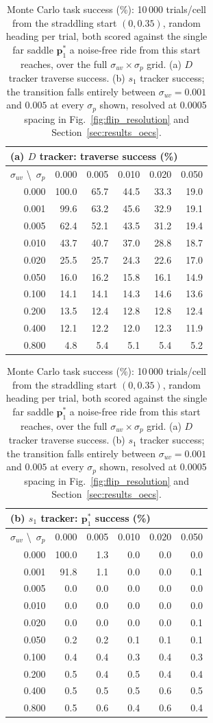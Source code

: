 \documentclass[lettersize,journal]{IEEEtran}
\begin{document}
\begin{table}[!t]
\centering
\caption{Monte Carlo task success (\%): 10\,000 trials/cell from the
straddling start $(0, 0.35)$, random heading per trial, both scored
against the single far saddle $\mathbf{p}^*_1$ a noise-free ride from
this start reaches, over the full $\sigma_{uv} \times \sigma_p$ grid.
(a) $D$ tracker traverse success. (b) $s_1$ tracker success; the
transition falls entirely between $\sigma_{uv} = 0.001$ and $0.005$ at
every $\sigma_p$ shown, resolved at 0.0005 spacing in
Fig.~\ref{fig:flip_resolution} and Section~\ref{sec:results_oecs}.}
\label{tab:mc_success}
\footnotesize
\setlength{\tabcolsep}{4pt}
\begin{tabular}{r|rrrrr}
\multicolumn{6}{l}{(a) $D$ tracker: traverse success (\%)} \\
\hline
$\sigma_{uv}$ \textbackslash\ $\sigma_p$ & 0.000 & 0.005 & 0.010 & 0.020 & 0.050 \\
\hline
0.000 & 100.0 & 65.7 & 44.5 & 33.3 & 19.0 \\
0.001 &  99.6 & 63.2 & 45.6 & 32.9 & 19.1 \\
0.005 &  62.4 & 52.1 & 43.5 & 31.2 & 19.4 \\
0.010 &  43.7 & 40.7 & 37.0 & 28.8 & 18.7 \\
0.020 &  25.5 & 25.7 & 24.3 & 22.6 & 17.0 \\
0.050 &  16.0 & 16.2 & 15.8 & 16.1 & 14.9 \\
0.100 &  14.1 & 14.1 & 14.3 & 14.6 & 13.6 \\
0.200 &  13.5 & 12.4 & 12.8 & 12.8 & 12.4 \\
0.400 &  12.1 & 12.2 & 12.0 & 12.3 & 11.9 \\
0.800 &   4.8 &  5.4 &  5.1 &  5.4 &  5.2 \\
\hline
\end{tabular}
\hspace{1.5em}
\begin{tabular}{r|rrrrr}
\multicolumn{6}{l}{(b) $s_1$ tracker: $\mathbf{p}^*_1$ success (\%)} \\
\hline
$\sigma_{uv}$ \textbackslash\ $\sigma_p$ & 0.000 & 0.005 & 0.010 & 0.020 & 0.050 \\
\hline
0.000 & 100.0 &  1.3 &  0.0 &  0.0 &  0.0 \\
0.001 &  91.8 &  1.1 &  0.0 &  0.0 &  0.1 \\
0.005 &   0.0 &  0.0 &  0.0 &  0.0 &  0.0 \\
0.010 &   0.0 &  0.0 &  0.0 &  0.0 &  0.0 \\
0.020 &   0.0 &  0.0 &  0.0 &  0.0 &  0.1 \\
0.050 &   0.2 &  0.2 &  0.1 &  0.1 &  0.1 \\
0.100 &   0.4 &  0.4 &  0.3 &  0.4 &  0.3 \\
0.200 &   0.5 &  0.4 &  0.5 &  0.4 &  0.4 \\
0.400 &   0.5 &  0.5 &  0.5 &  0.6 &  0.5 \\
0.800 &   0.5 &  0.6 &  0.4 &  0.6 &  0.4 \\
\hline
\end{tabular}
\end{table}
\end{document}
